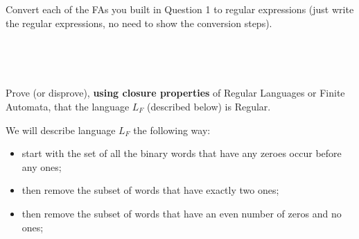 \documentclass[12pt]{article}
\newenvironment{exercise}[2][Exercise]{\begin{trivlist}
\item[\hskip \labelsep {\bfseries #1}\hskip \labelsep {\bfseries #2.}]}{\end{trivlist}}
\newenvironment{solution}[1][{\color{red} Solution:}]{\begin{trivlist}
\item[\hskip \labelsep {\bfseries #1}\hskip \labelsep {\bfseries}]}{\end{trivlist}}
\begin{document}
\newpage


\begin{exercise}{2}
Convert each of the FAs you built in Question 1 to regular expressions (just write the regular expressions, no need to show the conversion steps).
\end{exercise}

\begin{enumerate}[(a)]
	\item
	\begin{solution} \;\\
	
	\end{solution}
	
	\item
	\begin{solution}  \;\\
	
	\end{solution}
	
	\item
	\begin{solution}
	
	\end{solution}
	
\end{enumerate}

\clearpage

\begin{exercise}{3}

Prove (or disprove), \textbf{using closure properties} of Regular Languages or Finite Automata, that the language $L_F$ (described below) is Regular.

We will describe language $L_F$ the following way: 

\begin{itemize}
    \item start with the set of all the binary words that have any zeroes occur before any ones;
    \item then remove the subset of words that have exactly two ones;
    \item then remove the subset of words that have an even number of zeros and no ones;
\end{itemize}

\end{exercise}
\end{document}
